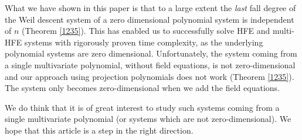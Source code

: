 \documentclass{amsart}
\theoremstyle{plain}
\theoremstyle{definition}
\begin{document}
What we have shown in this paper is that to a large extent the {\em last} fall degree of the Weil descent system of a zero dimensional polynomial system is independent of $n$ (Theorem \ref{1235}).  This has enabled us to successfully solve HFE and multi-HFE systems with rigorously proven time complexity, as the underlying polynomial systems are zero dimensional.  Unfortunately, the system coming from a single multivariate polynomial, without field equations, is not zero-dimensional and our approach using projection polynomials does not work (Theorem \ref{1235}). The system only becomes zero-dimensional when we add the field equations.

We do think that it is of great interest to study such systems coming from a single multivariate polynomial (or systems which are not zero-dimensional). We hope that this article is a step in the right direction.
\end{document}
